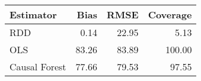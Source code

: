 \begin{table}[ht]
\centering
\begin{tabular}{lrrr}
  \hline
Estimator & Bias & RMSE & Coverage \\ 
  \hline
RDD & 0.14 & 22.95 & 5.13 \\ 
  OLS & 83.26 & 83.89 & 100.00 \\ 
  Causal Forest & 77.66 & 79.53 & 97.55 \\ 
   \hline
\end{tabular}
\end{table}
